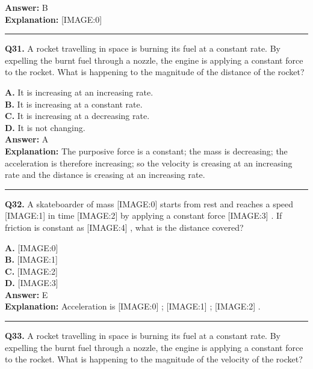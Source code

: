 \documentclass[12pt]{article}
\begin{document}
\textbf{Answer:} B \\
\textbf{Explanation:} [IMAGE:0]

\hrule
\vspace{1em}


\noindent
\textbf{Q31.} A rocket travelling in space is burning its fuel at a constant rate. By expelling the burnt fuel through a nozzle, the engine is applying a constant force to the rocket.
What is happening to the magnitude of the distance of the rocket?



\textbf{A.} It is increasing at an increasing rate. \\
\textbf{B.} It is increasing at a constant rate. \\
\textbf{C.} It is increasing at a decreasing rate. \\
\textbf{D.} It is not changing. \\

\textbf{Answer:} A \\
\textbf{Explanation:} The purposive force is a constant; the mass is decreasing; the acceleration is therefore increasing; so the velocity is creasing at an increasing rate and the distance is creasing at an increasing rate.

\hrule
\vspace{1em}


\noindent
\textbf{Q32.} A skateboarder of mass
[IMAGE:0]
starts from rest and reaches a speed
[IMAGE:1]
in time
[IMAGE:2]
by applying a constant force
[IMAGE:3]
. If friction is constant as
[IMAGE:4]
, what is the distance covered?



\textbf{A.} [IMAGE:0] \\
\textbf{B.} [IMAGE:1] \\
\textbf{C.} [IMAGE:2] \\
\textbf{D.} [IMAGE:3] \\

\textbf{Answer:} E \\
\textbf{Explanation:} Acceleration is
[IMAGE:0]
;
[IMAGE:1]
;
[IMAGE:2]
.

\hrule
\vspace{1em}


\noindent
\textbf{Q33.} A rocket travelling in space is burning its fuel at a constant rate. By expelling the burnt fuel through a nozzle, the engine is applying a constant force to the rocket.
What is happening to the magnitude of the velocity of the rocket?
\end{document}

